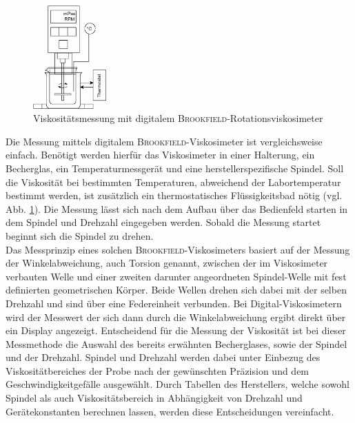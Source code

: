 
\begin{figure}[h!]
	\centering
	\includegraphics[width=0.25\textwidth]{img/viskosimeter}
	\caption{Viskositätsmessung mit digitalem \textsc{Brookfield}-Rotationsviskosimeter}
	\label{fig: viskosimeter}
\end{figure}
\FloatBarrier

Die Messung mittels digitalem \textsc{Brookfield}-Viskosimeter ist vergleichsweise einfach. Benötigt werden hierfür das Viskosimeter in einer Halterung, ein Becherglas, ein Temperaturmessgerät und eine herstellerspezifische Spindel. Soll die Viskosität bei bestimmten Temperaturen, abweichend der Labortemperatur bestimmt werden, ist zusätzlich ein thermostatisches Flüssigkeitsbad nötig (vgl. Abb. \ref{fig: viskosimeter}). Die Messung lässt sich nach dem Aufbau über das Bedienfeld starten in dem Spindel und Drehzahl eingegeben werden. Sobald die Messung startet beginnt sich die Spindel zu drehen.\\
Das Messprinzip eines solchen \textsc{Brookfield}-Viskosimeters basiert auf der Messung der Winkelabweichung, auch Torsion genannt, zwischen der im Viskosimeter verbauten Welle und einer zweiten darunter angeordneten Spindel-Welle mit fest definierten geometrischen Körper. Beide Wellen drehen sich dabei mit der selben Drehzahl  und sind über eine Federeinheit verbunden. Bei Digital-Viskosimetern wird der Messwert der sich dann durch die Winkelabweichung ergibt direkt über ein Display angezeigt.\linebreak
Entscheidend für die Messung der Viskosität ist bei dieser Messmethode die Auswahl des bereits erwähnten Becherglases, sowie der Spindel und der Drehzahl. Spindel und Drehzahl werden dabei unter Einbezug des Viskositätbereiches der Probe nach der gewünschten Präzision und dem Geschwindigkeitgefälle ausgewählt. \cite{DINDeutschesInstitutfurNormunge.V..September2018} 
Durch Tabellen des Herstellers, welche sowohl Spindel als auch Viskositätsbereich in Abhängigkeit von Drehzahl und Gerätekonstanten berechnen lassen, werden diese Entscheidungen vereinfacht. \cite{brookfield_31.01.2022}


